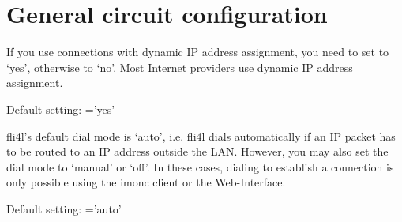 
  \section{General circuit configuration}

  \begin{description}


    {If you use connections with dynamic IP address assignment, you need to
     set  to `yes', otherwise to `no'. Most Internet
     providers use dynamic IP address assignment.

      Default setting: ='yes'}



    {fli4l's default dial mode is `auto', i.e. fli4l dials automatically
     if an IP packet has to be routed to an IP address outside the LAN. However,
     you may also set the dial mode to `manual' or `off'. In these cases,
     dialing to establish a connection is only possible using the
     imonc client or the Web-Interface.

      Default setting: ='auto'}

  \end{description}
